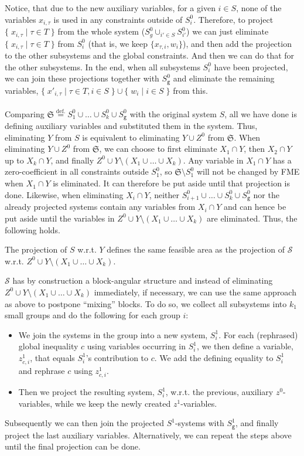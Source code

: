 \documentclass{llncs}
\newcommand{\trt}[1]{\texttt{#1}}
\newcommand{\set}[2]{\{\;{#1}\;|\;{#2}\;\}}
\begin{document}
Notice, that due to the new auxiliary variables, for a given $i\in S$, none of the variables $x_{i,\tau}$ is used in any constraints outside of $S^0_i$. Therefore, to project $\set{x_{i,\tau}}{\tau\in T}$ from the whole system ($S^0_g\cup_{i'\in S}S^0_{i'}$) we can just eliminate $\set{x_{i,\tau}}{\tau\in T}$ from $S_i^0$ (that is, we keep $\{x_{\tau,i}, w_i\}$), and then add the projection to the other subsystems and the global constraints. And then we can do that for the other subsystems. 
In the end, when all subsystems $S^0_i$ have been projected, we can join these projections together with $S^0_\trt{g}$ and eliminate the remaining variables, $\set{x'_{i,\tau}}{\tau\in T, i\in S}\cup\set{w_i}{i\in S}$ from this.
\\\\
\noindent Comparing $\mathfrak{S} \overset{\text{def.}}{=} S_1^0\cup\ldots\cup S_k^0\cup S_\trt{g}^0$ with the original system $S$, all we have done is defining auxiliary variables and substituted them in the system. Thus, eliminating $Y$ from $S$ is equivalent to eliminating $Y \cup Z^0$ from $\mathfrak{S}$. 
%
When eliminating $Y\cup Z^0$ from $\mathfrak{S}$, we can choose to first eliminate $X_1\cap Y$, then $X_2\cap Y$ up to $X_k\cap Y$, and finally $Z^0\cup Y\setminus(X_1\cup \ldots\cup X_k)$. 
Any variable in $X_1\cap Y$ has a zero-coefficient in all constraints outside $S^0_1$, so $\mathfrak{S}\setminus S^0_1$ will not be changed by FME when $X_1\cap Y$ is eliminated. It can therefore be put aside until that projection is done. 
Likewise, when eliminating $X_i\cap Y$, neither $S_{i+1}^0\cup \ldots \cup S_k^0\cup S_\trt{g}^0$ nor the already projected systems contain any variables from $X_i\cap Y$ and can hence be put aside until the variables in $Z^0\cup Y\setminus(X_1\cup \ldots\cup X_k)$ are eliminated. Thus, the following holds. 
%
\begin{proposition}
The projection of $S$ w.r.t. $Y$ defines the same feasible area as 
the projection of $\mathcal{S}$ w.r.t. $Z^0 \cup Y\setminus (X_1\cup \ldots \cup X_k)$. 
\end{proposition}
%
$\mathcal{S}$ has by construction a block-angular structure and instead of eliminating $Z^0\cup Y\setminus(X_1\cup\ldots\cup X_k)$ immediately, if necessary, we can use the same approach as above to postpone ``mixing'' blocks.
To do so, we collect all subsystems into $k_1$ small groups and do the following for each group $i$: 
\begin{itemize}\itemsep0em
\item We join the systems in the group into a new system, $S^1_i$. For each (rephrased) global inequality $c$ using variables occurring in $S^1_i$, we then define a variable, $z^1_{c,i}$, that equals $S^1_i$'s contribution to $c$. We add the defining equality to $S^1_i$ and rephrase $c$ using $z^1_{c,i}$.
\item Then we project the resulting system, $S^1_i$, w.r.t. the previous, auxiliary $z^0$-variables, while we keep the newly created $z^1$-variables.
\end{itemize} 
Subsequently we can then join the projected $S^1$-systems with $S_\trt{g}^1$, and finally project the last auxiliary variables. Alternatively, we can repeat the steps above until the final projection can be done. 
\end{document}

